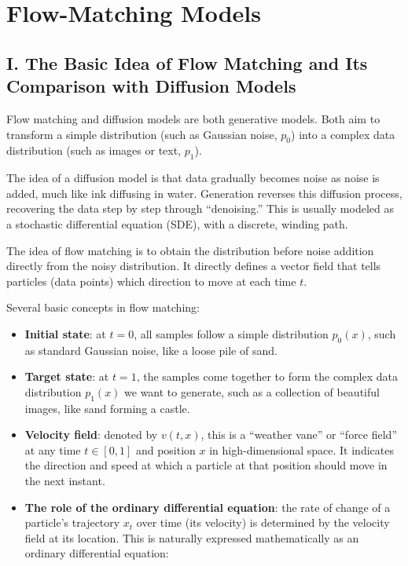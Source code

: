 \setcounter{section}{0}

\hypertarget{flow-matching-models-1}{%
\section{Flow-Matching Models}\label{flow-matching-models-1}}

\hypertarget{i.-the-basic-idea-of-flow-matching-and-its-comparison-with-diffusion-models}{%
\subsection{I. The Basic Idea of Flow Matching and Its Comparison with Diffusion Models}\label{i.-the-basic-idea-of-flow-matching-and-its-comparison-with-diffusion-models}}

Flow matching and diffusion models are both generative models. Both aim to transform a simple distribution (such as Gaussian noise, \(p_0\)) into a complex data distribution (such as images or text, \(p_1\)).

The idea of a diffusion model is that data gradually becomes noise as noise is added, much like ink diffusing in water. Generation reverses this diffusion process, recovering the data step by step through ``denoising.'' This is usually modeled as a stochastic differential equation (SDE), with a discrete, winding path.

The idea of flow matching is to obtain the distribution before noise addition directly from the noisy distribution. It directly defines a vector field that tells particles (data points) which direction to move at each time \(t\).

Several basic concepts in flow matching:

\begin{itemize}
\tightlist
\item
  \textbf{Initial state}: at \(t=0\), all samples follow a simple distribution \(p_0(x)\), such as standard Gaussian noise, like a loose pile of sand.
\item
  \textbf{Target state}: at \(t=1\), the samples come together to form the complex data distribution \(p_1(x)\) we want to generate, such as a collection of beautiful images, like sand forming a castle.
\item
  \textbf{Velocity field}: denoted by \(v(t,x)\), this is a ``weather vane'' or ``force field'' at any time \(t\in[0,1]\) and position \(x\) in high-dimensional space. It indicates the direction and speed at which a particle at that position should move in the next instant.
\item
  \textbf{The role of the ordinary differential equation}: the rate of change of a particle's trajectory \(x_t\) over time (its velocity) is determined by the velocity field at its location. This is naturally expressed mathematically as an ordinary differential equation:
\end{itemize}

